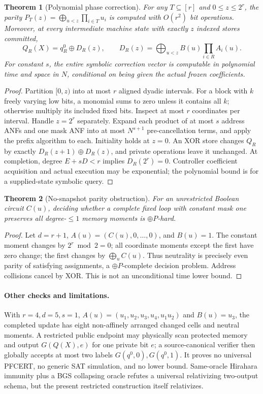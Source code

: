 \documentclass{article}
\newtheorem{theorem}{Theorem}
\begin{document}
\begin{theorem}[Polynomial phase correction]
For any \(T\subseteq[r]\) and \(0\le z\le2^r\), the parity
\(P_T(z)=\bigoplus_{u<z}\prod_{i\in T}u_i\)
is computed with \(O(r^2)\) bit operations. Moreover, at every intermediate machine state with exactly \(z\) indexed stores committed,
\[
Q_R(X)=q_R^0\oplus D_R(z),\qquad
D_R(z)=\bigoplus_{u<z}B(u)\prod_{i\in R}A_i(u).
\]
For constant \(s\), the entire symbolic correction vector is computable in polynomial time and space in \(N\), conditional on being given the actual frozen coefficients.
\end{theorem}
\begin{proof}
Partition \([0,z)\) into at most \(r\) aligned dyadic intervals. For a block with \(k\) freely varying low bits, a monomial sums to zero unless it contains all \(k\); otherwise multiply its included fixed bits. Inspect at most \(r\) coordinates per interval. Handle \(z=2^r\) separately. Expand each product of at most \(s\) address ANFs and one mask ANF into at most \(N^{s+1}\) pre-cancellation terms, and apply the prefix algorithm to each. Initiality holds at \(z=0\). An XOR store changes \(Q_R\) by exactly \(D_R(z+1)\oplus D_R(z)\), and private operations leave it unchanged. At completion, degree \(E+sD<r\) implies \(D_R(2^r)=0\). Controller coefficient acquisition and actual execution may be exponential; the polynomial bound is for a supplied-state symbolic query.
\end{proof}

\begin{theorem}[No-snapshot parity obstruction]
For an unrestricted Boolean circuit \(C(u)\), deciding whether a complete fixed loop with constant mask one preserves all degree-\(\le1\) memory moments is \(\oplus P\)-hard.
\end{theorem}
\begin{proof}
Let \(d=r+1\), \(A(u)=(C(u),0,\ldots,0)\), and \(B(u)=1\). The constant moment changes by \(2^r\bmod 2=0\); all coordinate moments except the first have zero change; the first changes by \(\bigoplus_u C(u)\). Thus neutrality is precisely even parity of satisfying assignments, a \(\oplus P\)-complete decision problem. Address collisions cancel by XOR. This is not an unconditional time lower bound.
\end{proof}

\paragraph{Other checks and limitations.}
With \(r=4,d=5,s=1\), \(A(u)=(u_1,u_2,u_3,u_4,u_1u_2)\) and \(B(u)=u_3\), the completed update has eight non-affinely arranged changed cells and neutral moments. A restricted public endpoint may physically scan protected memory and output \(G(Q(X),e)\) for one private bit \(e\); a source-canonical verifier then globally accepts at most two labels \(G(q^0,0),G(q^0,1)\). It proves no universal PFCERT, no generic SAT simulation, and no lower bound. Same-oracle Hirahara immunity plus a BGS collapsing oracle refutes a universal relativizing two-output schema, but the present restricted construction itself relativizes.
\end{document}
